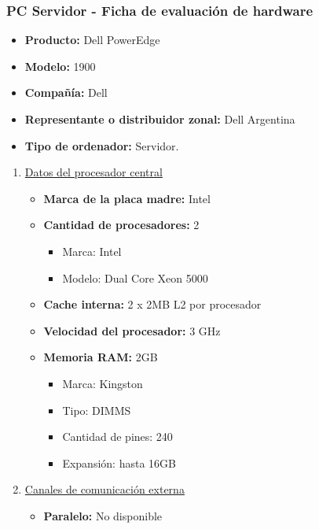\subsubsection{PC Servidor - Ficha de evaluación de hardware}
\begin{itemize}
  \item \textbf{Producto:} Dell PowerEdge\texttrademark
  \item \textbf{Modelo:} 1900
  \item \textbf{Compañía:} Dell
  \item \textbf{Representante o distribuidor zonal:} Dell Argentina
  \item \textbf{Tipo de ordenador:} Servidor.
\end{itemize}

\begin{enumerate}

  \item \underline{Datos del procesador central}
  \begin{itemize}
    \item \textbf{Marca de la placa madre:} Intel
    
    \item \textbf{Cantidad de procesadores:} 2
    \begin{itemize}
      \item Marca: Intel
      \item Modelo: Dual Core Xeon 5000
    \end{itemize}
    
    \item \textbf{Cache interna:} 2 x 2MB L2 por procesador
    \item \textbf{Velocidad del procesador:} 3 GHz
    \item \textbf{Memoria RAM:} 2GB
    
    \begin{itemize}
      \item Marca: Kingston
      \item Tipo: DIMMS
      \item Cantidad de pines: 240
      \item Expansión: hasta 16GB
    \end{itemize}
  \end{itemize}
  
  
  \item \underline{Canales de comunicación externa}
  \begin{itemize}
    \item \textbf{Paralelo:} No disponible
    

\end{itemize}
\end{enumerate}
